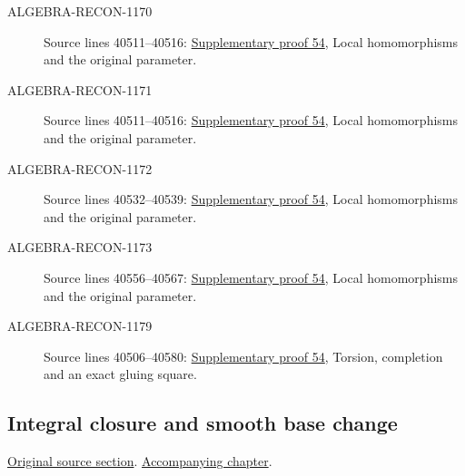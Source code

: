 \begin{description}
\item[ALGEBRA-RECON-1170] Source lines 40511--40516: \hyperlink{algebra_local_integral_notes_20260928}{Supplementary proof 54}, Local homomorphisms and the original parameter.
\item[ALGEBRA-RECON-1171] Source lines 40511--40516: \hyperlink{algebra_local_integral_notes_20260928}{Supplementary proof 54}, Local homomorphisms and the original parameter.
\item[ALGEBRA-RECON-1172] Source lines 40532--40539: \hyperlink{algebra_local_integral_notes_20260928}{Supplementary proof 54}, Local homomorphisms and the original parameter.
\item[ALGEBRA-RECON-1173] Source lines 40556--40567: \hyperlink{algebra_local_integral_notes_20260928}{Supplementary proof 54}, Local homomorphisms and the original parameter.
\item[ALGEBRA-RECON-1179] Source lines 40506--40580: \hyperlink{algebra_local_integral_notes_20260928}{Supplementary proof 54}, Torsion, completion and an exact gluing square.
\end{description}

\subsection{Integral closure and smooth base change}
\hypertarget{algebra-source-section-integral-closure-smooth-base-change}{}
\noindent\href{https://github.com/stacks/stacks-project/blob/a04446e57ec1fbc252a871afcec7752fb2807b14/algebra.tex\#L40586}{Original source section}. \href{algebra.pdf\#nameddest=section-integral-closure-smooth-base-change}{Accompanying chapter}.

